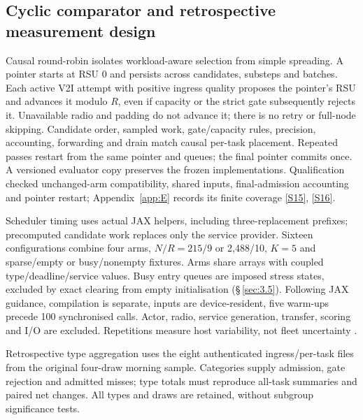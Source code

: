 \documentclass[11pt,a4paper]{article}
\begin{document}
\subsection{Cyclic comparator and retrospective measurement design}\label{sec:2.8}

Causal round-robin isolates workload-aware selection from simple spreading. A pointer starts at RSU 0 and persists across candidates, substeps and batches. Each active V2I attempt with positive ingress quality proposes the pointer's RSU and advances it modulo $R$, even if capacity or the strict gate subsequently rejects it. Unavailable radio and padding do not advance it; there is no retry or full-node skipping. Candidate order, sampled work, gate/capacity rules, precision, accounting, forwarding and drain match causal per-task placement. Repeated passes restart from the same pointer and queues; the final pointer commits once. A versioned evaluator copy preserves the frozen implementations. Qualification checked unchanged-arm compatibility, shared inputs, final-admission accounting and pointer restart; Appendix~\ref{app:E} records its finite coverage \hyperref[source-s15]{[S15]}, \hyperref[source-s16]{[S16]}.

Scheduler timing uses actual JAX helpers, including three-replacement prefixes; precomputed candidate work replaces only the service provider. Sixteen configurations combine four arms, $N/R=215/9$ or 2,488/10, $K=5$ and sparse/empty or busy/nonempty fixtures. Arms share arrays with coupled type/deadline/service values. Busy entry queues are imposed stress states, excluded by exact clearing from empty initialisation (\S\,\ref{sec:3.5}). Following JAX guidance, compilation is separate, inputs are device-resident, five warm-ups precede 100 synchronised calls. Actor, radio, service generation, transfer, scoring and I/O are excluded. Repetitions measure host variability, not fleet uncertainty \cite{ref14}.

Retrospective type aggregation uses the eight authenticated ingress/per-task files from the original four-draw morning sample. Categories supply admission, gate rejection and admitted misses; type totals must reproduce all-task summaries and paired net changes. All types and draws are retained, without subgroup significance tests.
\end{document}

